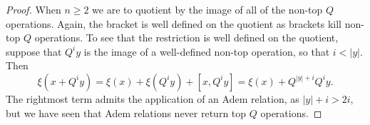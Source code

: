 \documentclass[11pt]{article}
\newcommand{\restn}[1]{\xi{#1}}
\newcommand{\LambdaOp}{Q}
\begin{document}
\begin{DiagramOfFunctors}
\begin{proof}
When $n\geq2$  we are to quotient by the image of all of the non-top $\LambdaOp$ operations. Again, the bracket is well defined on the quotient as brackets kill non-top $\LambdaOp$ operations. To see that the restriction is well defined on the quotient, %
suppose that $\LambdaOp^iy$ is the image of a well-defined non-top operation, so that $i<|y|$. Then
\[\restn{(x+\LambdaOp^iy)}=\restn{(x)}+\restn{(\LambdaOp^iy)}+[x,\LambdaOp^iy]=\restn{(x)}+\LambdaOp^{|y|+i}\LambdaOp^iy.\]
The rightmost term admits the application of an Adem relation, as $|y|+i>2i$, but we have seen that Adem relations never return top $\LambdaOp$ operations.


\end{proof}
\end{DiagramOfFunctors}
\end{document}
